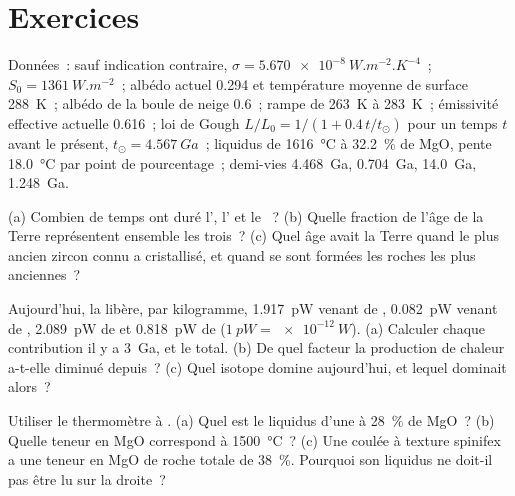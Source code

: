 \section*{Exercices}\label{sec:b2:precambrian-earth:exercises}

Données~: sauf indication contraire, $\sigma = \qty{5.670e-8}{W.m^{-2}.K^{-4}}$~;
$S_0 = \qty{1361}{W.m^{-2}}$~; albédo actuel 0.294 et température moyenne de surface \qty{288}{K}~;
albédo de la boule de neige 0.6~; rampe de \qty{263}{K} à \qty{283}{K}~; émissivité effective actuelle
0.616~; loi de Gough $L/L_0 = 1/(1 + 0.4\,t/t_\odot)$ pour un temps $t$ avant le présent, $t_\odot =
\qty{4.567}{Ga}$~; liquidus de  \qty{1616}{\celsius} à \qty{32.2}{\percent} de MgO,
pente \qty{18.0}{\celsius} par point de pourcentage~; demi-vies  \qty{4.468}{Ga}, 
\qty{0.704}{Ga},  \qty{14.0}{Ga},  \qty{1.248}{Ga}.

\begin{exercise}[$\star$]\label{exo:b2:precambrian-earth:1}
(a) Combien de temps ont duré l', l' et le ~? (b) Quelle fraction de l'âge
de la Terre représentent ensemble les trois~? (c) Quel âge avait la Terre quand le plus ancien zircon connu a cristallisé,
et quand se sont formées les roches les plus anciennes~?
\end{exercise}

\begin{exercise}[$\star$]\label{exo:b2:precambrian-earth:2}
Aujourd'hui, la  libère, par kilogramme, \qty{1.917}{pW} venant de ,
\qty{0.082}{pW} venant de , \qty{2.089}{pW} de  et \qty{0.818}{pW} de
 ($\qty{1}{pW} = \qty{e-12}{W}$). (a) Calculer chaque contribution il y a \qty{3}{Ga}, et
le total. (b) De quel facteur la production de chaleur a-t-elle diminué depuis~? (c) Quel isotope domine
aujourd'hui, et lequel dominait alors~?
\end{exercise}

\begin{exercise}[$\star$]\label{exo:b2:precambrian-earth:3}
Utiliser le thermomètre à . (a) Quel est le liquidus d'une  à
\qty{28}{\percent} de MgO~? (b) Quelle teneur en MgO correspond à \qty{1500}{\celsius}~? (c) Une
coulée à texture spinifex a une teneur en MgO de roche totale de \qty{38}{\percent}.
Pourquoi son liquidus ne doit-il pas être lu sur la droite~?
\end{exercise}

